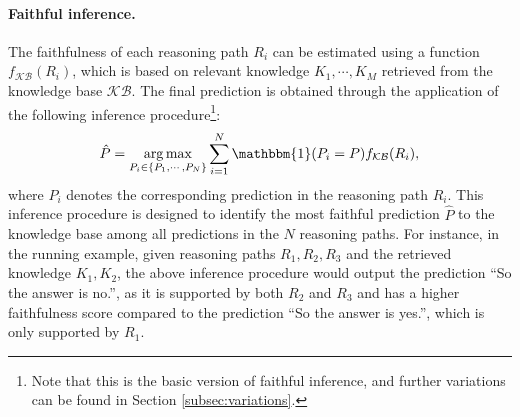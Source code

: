 \paragraph{Faithful inference.} 
The faithfulness of each reasoning path $R_i$ can be estimated using a function $f_{\mathcal{KB}}(R_i)$, which is based on relevant knowledge $K_1, \cdots, K_M$ retrieved from the knowledge base $\mathcal{KB}$. The final prediction is obtained through the application of the following inference procedure\footnote{Note that this is the basic version of faithful inference, and further variations can be found in Section \ref{subsec:variations}.}:
\begin{equation}
\hat{P} = \argmax_{P_i \in\{P_1, \cdots, P_N\}} \sum_{i=1}^N \mathbbm{1}(P_i=P) f_{\mathcal{KB}}(R_i),
\label{eq:inference}
\end{equation}
where $P_i$ denotes the corresponding prediction in the reasoning path $R_i$. This inference procedure is designed to identify the most faithful prediction $\hat{P}$ to the knowledge base among all predictions in the $N$ reasoning paths. For instance, in the running example, given reasoning paths $R_1, R_2, R_3$ and the retrieved knowledge $K_1, K_2$, the above inference procedure would output the prediction ``So the answer is no.'', as it is supported by both $R_2$ and $R_3$ and has a higher faithfulness score compared to the prediction ``So the answer is yes.'', which is only supported by $R_1$. 


